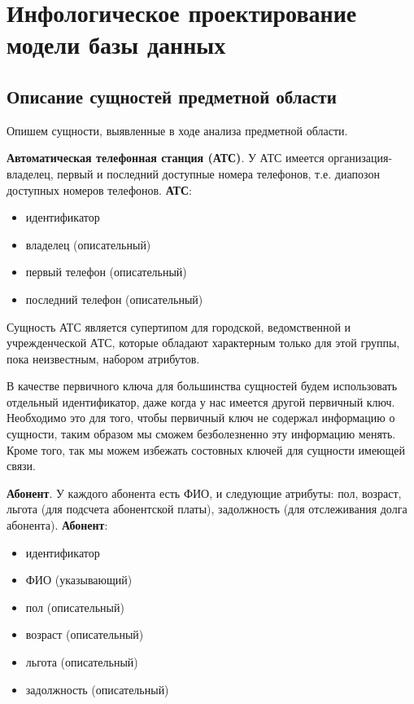 \documentclass{report}
\begin{document}
\chapter{Инфологическое проектирование модели базы данных}

\section{Описание сущностей предметной области}
Опишем сущности, выявленные в ходе анализа предметной области.

\textbf{Автоматическая телефонная станция (АТС)}. У АТС имеется 
организация-владелец, первый и последний доступные номера телефонов, 
т.е. диапозон доступных номеров телефонов. 
\newline\textbf{АТС}:
\begin{itemize}
    \item идентификатор
    \item владелец (описательный)
    \item первый телефон (описательный)
    \item последний телефон (описательный)
\end{itemize}
Сущность АТС является супертипом для городской, 
ведомственной и учрежден\-чес\-кой АТС, которые обладают характерным только 
для этой группы, пока неизвестным, набором атрибутов.

В качестве первичного ключа для большинства сущностей будем использовать
отдельный идентификатор, даже когда у нас имеется другой первичный ключ.
Необходимо это для того, чтобы первичный ключ не содержал информацию
о сущности, таким образом мы сможем безболезненно эту информацию
менять. Кроме того, так мы можем избежать состовных ключей для 
сущности имеющей связи.

\textbf{Абонент}. У каждого абонента есть ФИО, 
и следующие атрибуты: пол, возраст, льгота (для подсчета 
абонентской платы), задолжность (для отслеживания долга абонента). 
\newline\textbf{Абонент}:
\begin{itemize}
    \item идентификатор
    \item ФИО (указывающий)
    \item пол (описательный)
    \item возраст (описательный)
    \item льгота (описательный)
    \item задолжность (описательный)
\end{itemize}
\end{document}
